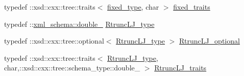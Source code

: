 \begin{DoxyCompactItemize}
\item 
typedef \+::xsd\+::cxx\+::tree\+::traits$<$ \hyperlink{classparticletype__t_a689bb940332f300e99acdf3d50ffdc2c}{fixed\+\_\+type}, char $>$ \hyperlink{classparticletype__t_ae90f4fb144ba140e553d5aaeca48ebb5}{fixed\+\_\+traits}
\item 
typedef \+::\hyperlink{namespacexml__schema_aac2d3d3483d3a20e8d96d2e8e5b3a470}{xml\+\_\+schema\+::double\+\_\+} \hyperlink{classparticletype__t_a3cd2c72b9a4607fb4e7022af7f979d61}{Rtrunc\+L\+J\+\_\+type}
\item 
typedef \+::xsd\+::cxx\+::tree\+::optional$<$ \hyperlink{classparticletype__t_a3cd2c72b9a4607fb4e7022af7f979d61}{Rtrunc\+L\+J\+\_\+type} $>$ \hyperlink{classparticletype__t_aa09967796541d58a44dfec6bcbb2c431}{Rtrunc\+L\+J\+\_\+optional}
\item 
typedef \+::xsd\+::cxx\+::tree\+::traits$<$ \hyperlink{classparticletype__t_a3cd2c72b9a4607fb4e7022af7f979d61}{Rtrunc\+L\+J\+\_\+type}, char,\+::xsd\+::cxx\+::tree\+::schema\+\_\+type\+::double\+\_\+ $>$ \hyperlink{classparticletype__t_acbef1d01c89e1d6db8eed5d7b7b8575c}{Rtrunc\+L\+J\+\_\+traits}
\end{DoxyCompactItemize}

